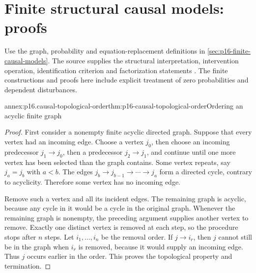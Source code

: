 \section{Finite structural causal models: proofs}
\label{sec:annex-p16-finite-causal-models}

Use the graph, probability and equation-replacement definitions in
\cref{sec:p16-finite-causal-models}. The source supplies the structural
interpretation, intervention operation, identification criterion and
factorization statements
\cite[secs.~3.1--3.2.3, pp.~103--112]{Pearl2009CausalOverview}.
The finite constructions and proofs here include explicit treatment of
zero probabilities and dependent disturbances.

\begin{annexitem}{annex:p16.causal-topological-order}{thm:p16-causal-topological-order}{Ordering an acyclic finite graph}
\begin{proof}
First consider a nonempty finite acyclic directed graph. Suppose that every
vertex had an incoming edge. Choose a vertex \(j_0\), then choose an
incoming predecessor \(j_1\to j_0\), then a predecessor
\(j_2\to j_1\), and continue until one more vertex has been selected
than the graph contains. Some vertex repeats, say \(j_a=j_b\)
with \(a<b\). The edges
\(j_b\to j_{b-1}\to\cdots\to j_a\) form a directed cycle,
contrary to acyclicity. Therefore some vertex has no incoming edge.

Remove such a vertex and all its incident edges. The remaining graph is
acyclic, because any cycle in it would be a cycle in the original graph.
Whenever the remaining graph is nonempty, the preceding argument supplies
another vertex to remove. Exactly one distinct vertex is removed at each
step, so the procedure stops after \(n\) steps. Let
\(i_1,\ldots,i_n\) be the removal order. If \(j\to i_r\), then
\(j\) cannot still be in the graph when \(i_r\) is removed, because
it would supply an incoming edge. Thus \(j\) occurs earlier in the
order. This proves the topological property and termination.
\end{proof}
\end{annexitem}

